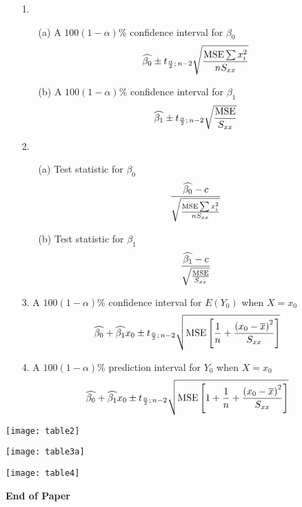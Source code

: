 \documentclass[12pt]{article}
\begin{document}
\begin{enumerate}
\item[1.]
\begin{enumerate}
\item[(a)]
A $100(1 - \alpha)\%$ confidence interval for $\beta_0$
$$
\widehat{\beta_0} \pm t_{\frac{\alpha}{2};\,n - 2}\sqrt{\frac{{\rm MSE}\sum x_i^2}{nS_{xx}}}
$$
\item[(b)]
A $100(1 - \alpha)\%$ confidence interval for $\beta_1$
$$
\widehat{\beta_1} \pm t_{\frac{\alpha}{2};\,n - 2}\sqrt{\frac{{\rm MSE}}{S_{xx}}}
$$
\end{enumerate}
\item[2.]
\begin{enumerate}
\item[(a)]
Test statistic for $\beta_0$
$$
\frac{\widehat{\beta_0} - c}{\sqrt{\frac{{\rm MSE}\sum x_i^2}{nS_{xx}}}}
$$
\item[(b)]
Test statistic for $\beta_1$
$$
\frac{\widehat{\beta_1} - c}{\sqrt{\frac{{\rm MSE}}{S_{xx}}}}
$$
\end{enumerate}
\item[3.]
A $100(1 - \alpha)\%$ confidence interval for $E(Y_0)$ when $X = x_0$
$$
\widehat{\beta_0} + \widehat{\beta_1}x_0 \pm t_{\frac{\alpha}{2};\,n - 2}\sqrt{{\rm MSE}\left[\frac{1}{n} + \frac{\left(x_0 - \overline{x}\right)^2}{S_{xx}}\right]}
$$
\item[4.]
A $100(1 - \alpha)\%$ prediction interval for $Y_0$ when $X = x_0$
$$
\widehat{\beta_0} + \widehat{\beta_1}x_0 \pm t_{\frac{\alpha}{2};\,n - 2}\sqrt{{\rm MSE}\left[1 + \frac{1}{n} + \frac{\left(x_0 - \overline{x}\right)^2}{S_{xx}}\right]}
$$
\end{enumerate}

\newpage

\vspace{0.8cm}

\centerline{\texttt{[image: table2]}}

\newpage

\vspace{3.5cm}

\centerline{\texttt{[image: table3a]}}

\newpage

\centerline{\texttt{[image: table4]}}

\begin{center}
{\bf \large  End of Paper}
\end{center}
\end{document}
